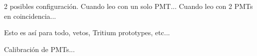 2 posibles configuración. 
Cuando leo con un solo PMT...
Cuando leo con 2 PMTs en coincidencia...

Esto es así para todo, vetos, Tritium prototypes, etc...

Calibración de PMTs... 